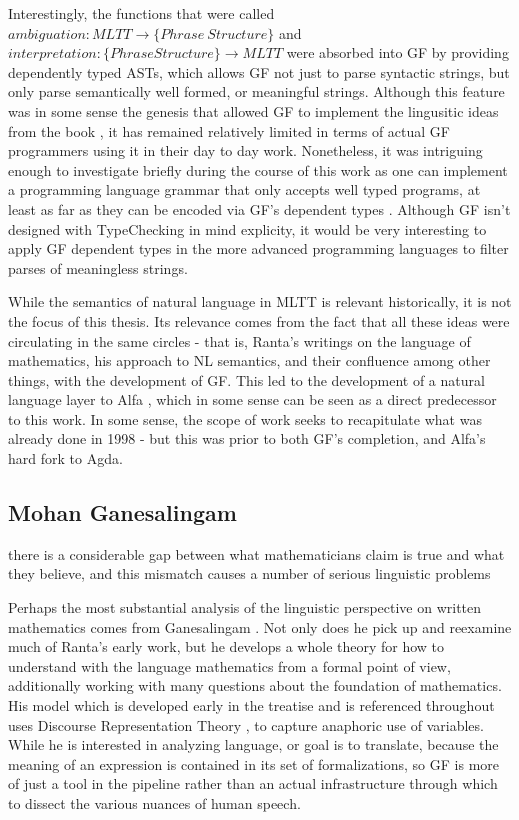Interestingly, the functions that were called $ambiguation : MLTT \to \{Phrase\
Structure\}$ and $interpretation : \{Phrase Structure\} \to MLTT$ were absorbed
into GF by providing dependently typed ASTs, which allows GF not just to parse
syntactic strings, but only parse semantically well formed, or meaningful
strings. Although this feature was in some sense the genesis that allowed GF to
implement the lingusitic ideas from the book \cite{rantaTT}, it has remained
relatively limited in terms of actual GF programmers using it in their day to
day work. Nonetheless, it was intriguing enough to investigate briefly during
the course of this work as one can implement a programming language grammar that
only accepts well typed programs, at least as far as they can be encoded via
GF's dependent types \cite{warrickHarper}. Although GF isn't designed with
TypeChecking in mind explicity, it would be very interesting to apply GF
dependent types in the more advanced programming languages to filter parses of
meaningless strings.

While the semantics of natural language in MLTT is relevant historically, it is
not the focus of this thesis. Its relevance comes from the fact that all these
ideas were circulating in the same circles - that is, Ranta's writings on the
language of mathematics, his approach to NL semantics, and their confluence
among other things, with the development of GF. This led to the development of a
natural language layer to Alfa \cite{alfaGF}, which in some sense can be seen as
a direct predecessor to this work. In some sense, the scope of work seeks to
recapitulate what was already done in 1998 - but this was prior to both GF's
completion, and Alfa's hard fork to Agda.

\subsection{Mohan Ganesalingam}


\begin{displayquote}

there is a considerable gap between what mathematicians claim is true and what
they believe, and this mismatch causes a number of serious linguistic problems

\end{displayquote}

Perhaps the most substantial analysis of the linguistic perspective on
written mathematics comes from Ganesalingam \cite{ganesalingam2013language}.
Not only does he pick up and reexamine much of Ranta's early work, but he
develops a whole theory for how to understand with the language mathematics from
a formal point of view, additionally working with many questions about the
foundation of mathematics. His model which is developed early in the treatise
and is referenced 
throughout uses Discourse Representation Theory \cite{kamp2011discourse}, to
capture anaphoric use of variables. While he is interested in analyzing
language, or goal is to translate, because the meaning of an expression is
contained in its set of formalizations, so GF is more of just a tool in the
pipeline rather than an actual infrastructure through which to dissect the various
nuances of human speech.


